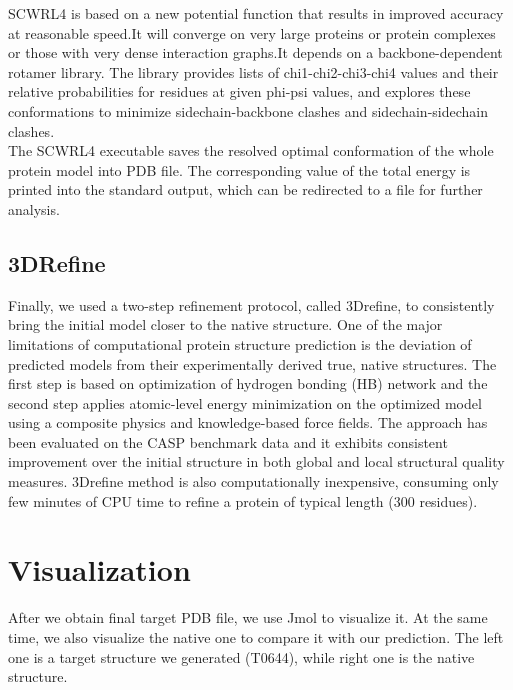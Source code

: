 \documentclass{article}
\begin{document}
SCWRL4 is based on a new potential function that results in improved accuracy at reasonable speed.It will converge on very large proteins or protein complexes or those with very dense interaction graphs.It depends on a backbone-dependent rotamer library. The library provides lists of chi1-chi2-chi3-chi4 values and their relative probabilities for residues at given phi-psi values, and explores these conformations to minimize sidechain-backbone clashes and sidechain-sidechain clashes.\\

The SCWRL4 executable saves the resolved optimal conformation of the whole protein model into PDB file. The corresponding value of the total energy is printed into the standard output, which can be redirected to a file for further analysis.

\subsection{3DRefine}

Finally, we used a two-step refinement protocol, called 3Drefine, to consistently bring the initial model closer to the native structure.  One of the major limitations of computational protein structure prediction is the deviation of predicted models from their experimentally derived true, native structures.  The first step is based on optimization of hydrogen bonding (HB) network and the second step applies atomic-level energy minimization on the optimized model using a composite physics and knowledge-based force fields. The approach has been evaluated on the CASP benchmark data and it exhibits consistent improvement over the initial structure in both global and local structural quality measures. 3Drefine method is also computationally inexpensive, consuming only few minutes of CPU time to refine a protein of typical length (300 residues).

\newpage
\section{Visualization}

After we obtain final target PDB file, we use Jmol to visualize it. At the same time, we also visualize the native one to compare it with our prediction.  The left one is a target structure we generated (T0644), while right one is the native structure.
\end{document}
